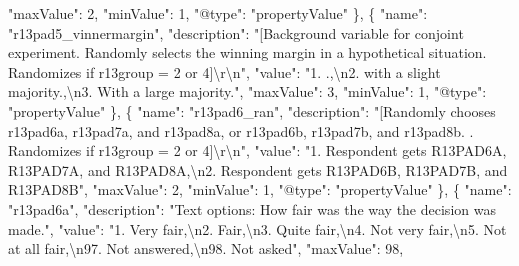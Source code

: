 \documentclass[
]{book}
\newenvironment{Shaded}{\begin{snugshade}}{\end{snugshade}}
\newcommand{\CharTok}[1]{\textcolor[rgb]{0.31,0.60,0.02}{#1}}
\newcommand{\DataTypeTok}[1]{\textcolor[rgb]{0.13,0.29,0.53}{#1}}
\newcommand{\DecValTok}[1]{\textcolor[rgb]{0.00,0.00,0.81}{#1}}
\newcommand{\FunctionTok}[1]{\textcolor[rgb]{0.00,0.00,0.00}{#1}}
\newcommand{\OtherTok}[1]{\textcolor[rgb]{0.56,0.35,0.01}{#1}}
\newcommand{\StringTok}[1]{\textcolor[rgb]{0.31,0.60,0.02}{#1}}
\begin{document}
\begin{Shaded}
\begin{Highlighting}[]
      \DataTypeTok{"maxValue"}\FunctionTok{:} \DecValTok{2}\FunctionTok{,}
      \DataTypeTok{"minValue"}\FunctionTok{:} \DecValTok{1}\FunctionTok{,}
      \DataTypeTok{"@type"}\FunctionTok{:} \StringTok{"propertyValue"}
    \FunctionTok{\}}\OtherTok{,}
    \FunctionTok{\{}
      \DataTypeTok{"name"}\FunctionTok{:} \StringTok{"r13pad5_vinnermargin"}\FunctionTok{,}
      \DataTypeTok{"description"}\FunctionTok{:} \StringTok{"[Background variable for conjoint experiment. Randomly selects the winning margin in a hypothetical situation. Randomizes if r13group = 2 or 4]}\CharTok{\textbackslash{}r\textbackslash{}n}\StringTok{"}\FunctionTok{,}
      \DataTypeTok{"value"}\FunctionTok{:} \StringTok{"1. .,}\CharTok{\textbackslash{}n}\StringTok{2. with a slight majority.,}\CharTok{\textbackslash{}n}\StringTok{3. With a large majority."}\FunctionTok{,}
      \DataTypeTok{"maxValue"}\FunctionTok{:} \DecValTok{3}\FunctionTok{,}
      \DataTypeTok{"minValue"}\FunctionTok{:} \DecValTok{1}\FunctionTok{,}
      \DataTypeTok{"@type"}\FunctionTok{:} \StringTok{"propertyValue"}
    \FunctionTok{\}}\OtherTok{,}
    \FunctionTok{\{}
      \DataTypeTok{"name"}\FunctionTok{:} \StringTok{"r13pad6_ran"}\FunctionTok{,}
      \DataTypeTok{"description"}\FunctionTok{:} \StringTok{"[Randomly chooses r13pad6a, r13pad7a, and r13pad8a, or r13pad6b, r13pad7b, and r13pad8b. . Randomizes if r13group = 2 or 4]}\CharTok{\textbackslash{}r\textbackslash{}n}\StringTok{"}\FunctionTok{,}
      \DataTypeTok{"value"}\FunctionTok{:} \StringTok{"1. Respondent gets R13PAD6A, R13PAD7A, and R13PAD8A,}\CharTok{\textbackslash{}n}\StringTok{2. Respondent gets R13PAD6B, R13PAD7B, and R13PAD8B"}\FunctionTok{,}
      \DataTypeTok{"maxValue"}\FunctionTok{:} \DecValTok{2}\FunctionTok{,}
      \DataTypeTok{"minValue"}\FunctionTok{:} \DecValTok{1}\FunctionTok{,}
      \DataTypeTok{"@type"}\FunctionTok{:} \StringTok{"propertyValue"}
    \FunctionTok{\}}\OtherTok{,}
    \FunctionTok{\{}
      \DataTypeTok{"name"}\FunctionTok{:} \StringTok{"r13pad6a"}\FunctionTok{,}
      \DataTypeTok{"description"}\FunctionTok{:} \StringTok{"Text options: How fair was the way the decision was made."}\FunctionTok{,}
      \DataTypeTok{"value"}\FunctionTok{:} \StringTok{"1. Very fair,}\CharTok{\textbackslash{}n}\StringTok{2. Fair,}\CharTok{\textbackslash{}n}\StringTok{3. Quite fair,}\CharTok{\textbackslash{}n}\StringTok{4. Not very fair,}\CharTok{\textbackslash{}n}\StringTok{5. Not at all fair,}\CharTok{\textbackslash{}n}\StringTok{97. Not answered,}\CharTok{\textbackslash{}n}\StringTok{98. Not asked"}\FunctionTok{,}
      \DataTypeTok{"maxValue"}\FunctionTok{:} \DecValTok{98}\FunctionTok{,}

\end{Highlighting}
\end{Shaded}
\end{document}
